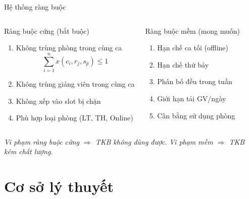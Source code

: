 \documentclass[aspectratio=169,10pt]{beamer}
\begin{document}
\begin{frame}{Hệ thống ràng buộc}
\begin{columns}[T]
\begin{alertblock}{Ràng buộc cứng (bắt buộc)}
\begin{enumerate}
  \item Không trùng phòng trong cùng ca
  $$\sum_{i=1}^{n} x(c_i, r_j, s_p) \leq 1$$
  \item Không trùng giảng viên trong cùng ca
  \item Không xếp vào slot bị chặn
  \item Phù hợp loại phòng (LT, TH, Online)
\end{enumerate}
\end{alertblock}

\begin{block}{Ràng buộc mềm (mong muốn)}
\begin{enumerate}
  \item Hạn chế ca tối (offline)
  \item Hạn chế thứ bảy
  \item Phân bố đều trong tuần
  \item Giới hạn tải GV/ngày
  \item Cân bằng sử dụng phòng
\end{enumerate}
\end{block}
\end{columns}

\vspace{0.4cm}
\begin{center}
\small\textit{Vi phạm ràng buộc cứng $\Rightarrow$ TKB không dùng được.
Vi phạm mềm $\Rightarrow$ TKB kém chất lượng.}
\end{center}
\end{frame}

\section{Cơ sở lý thuyết}
\end{document}
